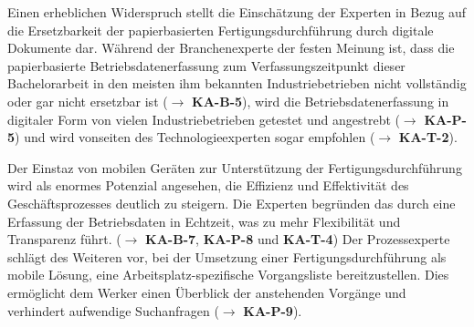 Einen erheblichen Widerspruch stellt die Einschätzung der Experten in Bezug auf die Ersetzbarkeit der papierbasierten Fertigungsdurchführung durch digitale Dokumente dar. 
Während der Branchenexperte der festen Meinung ist, dass die papierbasierte Betriebsdatenerfassung zum Verfassungszeitpunkt dieser Bachelorarbeit in den meisten ihm bekannten Industriebetrieben nicht vollständig oder gar nicht ersetzbar ist
($\rightarrow$ \textbf{KA-B-5}), wird die Betriebsdatenerfassung in digitaler Form von vielen Industriebetrieben getestet und angestrebt
($\rightarrow$ \textbf{KA-P-5})
und wird vonseiten des Technologieexperten sogar empfohlen
($\rightarrow$ \textbf{KA-T-2}).

Der Einstaz von mobilen Geräten zur Unterstützung der Fertigungsdurchführung wird als enormes Potenzial angesehen, die Effizienz und Effektivität des Geschäftsprozesses deutlich zu steigern. Die Experten begründen das durch eine Erfassung der Betriebsdaten in Echtzeit, was zu mehr Flexibilität und Transparenz führt. 
($\rightarrow$ \textbf{KA-B-7}, \textbf{KA-P-8} und \textbf{KA-T-4})
Der Prozessexperte schlägt des Weiteren vor, bei der Umsetzung einer Fertigungsdurchführung als mobile Lösung, eine Arbeitsplatz-spezifische Vorgangsliste bereitzustellen. Dies ermöglicht dem Werker einen Überblick der anstehenden Vorgänge und verhindert aufwendige Suchanfragen
($\rightarrow$ \textbf{KA-P-9}). 